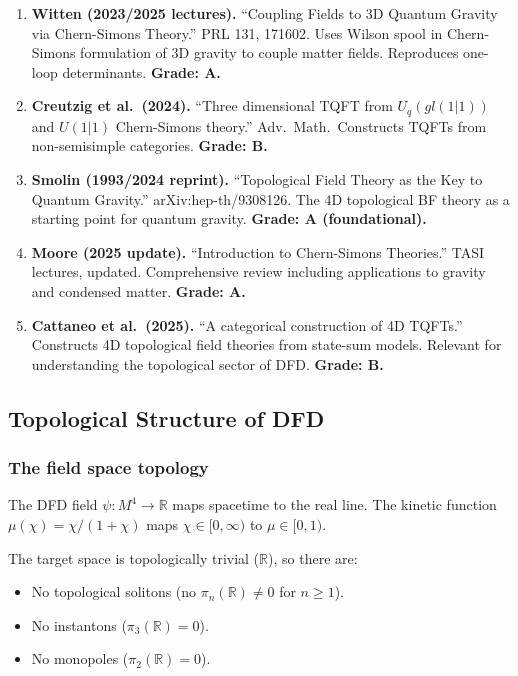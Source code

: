 \documentclass[11pt,a4paper]{article}
\begin{document}
\begin{enumerate}
\item \textbf{Witten (2023/2025 lectures).} ``Coupling Fields to 3D Quantum Gravity via Chern-Simons Theory.'' PRL 131, 171602. Uses Wilson spool in Chern-Simons formulation of 3D gravity to couple matter fields. Reproduces one-loop determinants. \textbf{Grade: A.}

\item \textbf{Creutzig et al.\ (2024).} ``Three dimensional TQFT from $U_q(gl(1|1))$ and $U(1|1)$ Chern-Simons theory.'' Adv.\ Math.\ Constructs TQFTs from non-semisimple categories. \textbf{Grade: B.}

\item \textbf{Smolin (1993/2024 reprint).} ``Topological Field Theory as the Key to Quantum Gravity.'' arXiv:hep-th/9308126. The 4D topological BF theory as a starting point for quantum gravity. \textbf{Grade: A (foundational).}

\item \textbf{Moore (2025 update).} ``Introduction to Chern-Simons Theories.'' TASI lectures, updated. Comprehensive review including applications to gravity and condensed matter. \textbf{Grade: A.}

\item \textbf{Cattaneo et al.\ (2025).} ``A categorical construction of 4D TQFTs.'' Constructs 4D topological field theories from state-sum models. Relevant for understanding the topological sector of DFD. \textbf{Grade: B.}
\end{enumerate}

\subsection{Topological Structure of DFD}

\subsubsection{The field space topology}

The DFD field $\psi: M^4 \to \mathbb{R}$ maps spacetime to the real line. The kinetic function $\mu(\chi) = \chi/(1+\chi)$ maps $\chi \in [0,\infty)$ to $\mu \in [0,1)$.

The target space is topologically trivial ($\mathbb{R}$), so there are:
\begin{itemize}
\item No topological solitons (no $\pi_n(\mathbb{R}) \neq 0$ for $n \geq 1$).
\item No instantons ($\pi_3(\mathbb{R}) = 0$).
\item No monopoles ($\pi_2(\mathbb{R}) = 0$).
\end{itemize}
\end{document}
